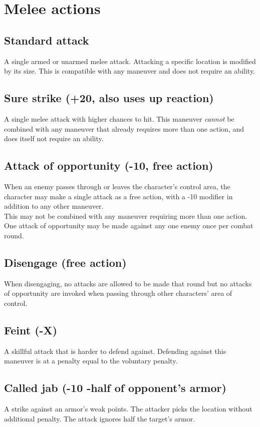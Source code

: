 \pagebreak %
\section{Melee actions}
\subsection*{Standard attack}
A single armed or unarmed melee attack. Attacking a specific location is modified by its size. This is compatible with any maneuver and does not require an ability.
\subsection*{Sure strike (+20, also uses up reaction)}
A single melee attack with higher chances to hit.
This maneuver \emph{cannot} be combined with any maneuver that already requires more than one action,
	and does itself not require an ability.
\subsection*{Attack of opportunity (-10, free action)}
When an enemy passes through or leaves the character’s control area,
	the character may make a single attack as a free action,
	with a -10 modifier in addition to any other maneuver.\\
This may not be combined with any maneuver requiring more than one action.\\
One attack of opportunity may be made against any one enemy once per combat round.
\subsection*{Disengage (free action)}
\label{action:disengage}
When disengaging, no attacks are allowed to be made that round but no attacks of opportunity are invoked when passing through other characters' area of control.
\subsection*{Feint (-X)}
A skillful attack that is harder to defend against. Defending against this maneuver is at a penalty equal to the voluntary penalty.
\subsection*{Called jab (-10 -half of opponent’s armor)}
A strike against an armor’s weak points. The attacker picks the location without additional penalty. The attack ignores half the target’s armor.
